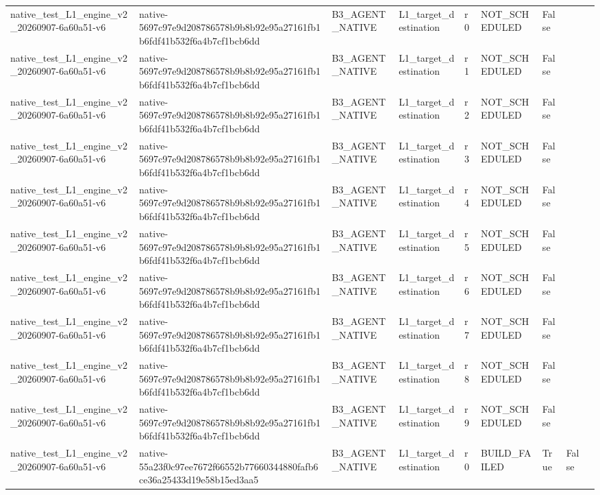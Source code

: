 \begin{tabular}{lllllllll}
native\_test\_L1\_engine\_v2\_20260907-6a60a51-v6 & native-5697c97e9d208786578b9b8b92e95a27161fb1b6fdf41b532f6a4b7cf1bcb6dd & B3\_AGENT\_NATIVE & L1\_target\_destination & r0 & NOT\_SCHEDULED & False &  &  \\
native\_test\_L1\_engine\_v2\_20260907-6a60a51-v6 & native-5697c97e9d208786578b9b8b92e95a27161fb1b6fdf41b532f6a4b7cf1bcb6dd & B3\_AGENT\_NATIVE & L1\_target\_destination & r1 & NOT\_SCHEDULED & False &  &  \\
native\_test\_L1\_engine\_v2\_20260907-6a60a51-v6 & native-5697c97e9d208786578b9b8b92e95a27161fb1b6fdf41b532f6a4b7cf1bcb6dd & B3\_AGENT\_NATIVE & L1\_target\_destination & r2 & NOT\_SCHEDULED & False &  &  \\
native\_test\_L1\_engine\_v2\_20260907-6a60a51-v6 & native-5697c97e9d208786578b9b8b92e95a27161fb1b6fdf41b532f6a4b7cf1bcb6dd & B3\_AGENT\_NATIVE & L1\_target\_destination & r3 & NOT\_SCHEDULED & False &  &  \\
native\_test\_L1\_engine\_v2\_20260907-6a60a51-v6 & native-5697c97e9d208786578b9b8b92e95a27161fb1b6fdf41b532f6a4b7cf1bcb6dd & B3\_AGENT\_NATIVE & L1\_target\_destination & r4 & NOT\_SCHEDULED & False &  &  \\
native\_test\_L1\_engine\_v2\_20260907-6a60a51-v6 & native-5697c97e9d208786578b9b8b92e95a27161fb1b6fdf41b532f6a4b7cf1bcb6dd & B3\_AGENT\_NATIVE & L1\_target\_destination & r5 & NOT\_SCHEDULED & False &  &  \\
native\_test\_L1\_engine\_v2\_20260907-6a60a51-v6 & native-5697c97e9d208786578b9b8b92e95a27161fb1b6fdf41b532f6a4b7cf1bcb6dd & B3\_AGENT\_NATIVE & L1\_target\_destination & r6 & NOT\_SCHEDULED & False &  &  \\
native\_test\_L1\_engine\_v2\_20260907-6a60a51-v6 & native-5697c97e9d208786578b9b8b92e95a27161fb1b6fdf41b532f6a4b7cf1bcb6dd & B3\_AGENT\_NATIVE & L1\_target\_destination & r7 & NOT\_SCHEDULED & False &  &  \\
native\_test\_L1\_engine\_v2\_20260907-6a60a51-v6 & native-5697c97e9d208786578b9b8b92e95a27161fb1b6fdf41b532f6a4b7cf1bcb6dd & B3\_AGENT\_NATIVE & L1\_target\_destination & r8 & NOT\_SCHEDULED & False &  &  \\
native\_test\_L1\_engine\_v2\_20260907-6a60a51-v6 & native-5697c97e9d208786578b9b8b92e95a27161fb1b6fdf41b532f6a4b7cf1bcb6dd & B3\_AGENT\_NATIVE & L1\_target\_destination & r9 & NOT\_SCHEDULED & False &  &  \\
native\_test\_L1\_engine\_v2\_20260907-6a60a51-v6 & native-55a23f0c97ee7672f66552b77660344880fafb6ce36a25433d19e58b15ed3aa5 & B3\_AGENT\_NATIVE & L1\_target\_destination & r0 & BUILD\_FAILED & True & False &  \\

\end{tabular}
